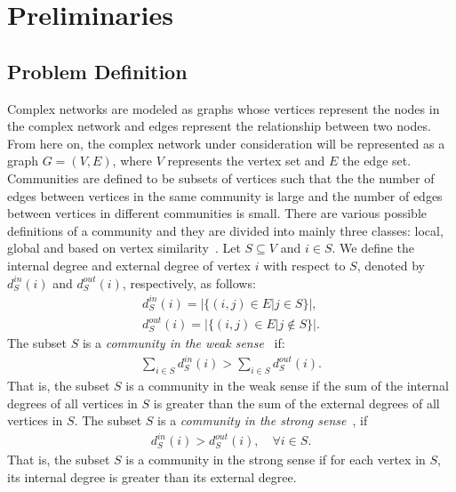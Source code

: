 \chapter{Preliminaries}\label{prelim}
\pagestyle{myheadings}
\begin{spacing}{1.5}
\thispagestyle{empty}
\section{Problem Definition}
Complex networks are modeled as graphs whose vertices represent the nodes in the complex network and edges represent the relationship between two nodes. From here on, the complex network under consideration will be represented as a graph $G=(V, E)$, where $V$ represents the vertex set and $E$ the edge set.\\
\indent Communities are defined to be subsets of vertices such that the the number of edges between vertices in the same community is large and the number of edges between vertices in different communities is small. There are various possible definitions of a community and they are divided into mainly three classes: local, global and based on vertex similarity~\cite{Fortunato201075, Wasserman-Social-1994}. Let $S \subseteq V$ and $i \in S$. We define the internal degree and external degree of vertex $i$ with respect to $S$, denoted by $d_S^{in}(i)$ and $d_S^{out}(i)$, respectively, as follows:
\begin{align}
d_S^{in}(i) = |\{(i, j) \in E | j \in S\}|,\\
d_S^{out}(i) = |\{(i, j) \in E | j \notin S\}|.
\end{align}
The subset $S$ is a \emph{community in the weak sense}~\cite{Radicchi02032004} if:
\begin{align}
\displaystyle\sum_{i \in S} d_S^{in}(i) > \displaystyle\sum_{i \in S} d_S^{out}(i).
\end{align}
That is, the subset $S$ is a community in the weak sense if the sum of the internal degrees of all vertices in $S$ is greater than the sum of the external degrees of all vertices in $S$. The subset $S$ is a \emph{community in the strong sense}~\cite{Radicchi02032004}, if
\begin{align}
d_S^{in}(i) > d_S^{out}(i), \quad\forall i \in S.
\end{align}
That is, the subset $S$ is a community in the strong sense if for each vertex in $S$, its internal degree is greater than its external degree.\\

\end{spacing}
